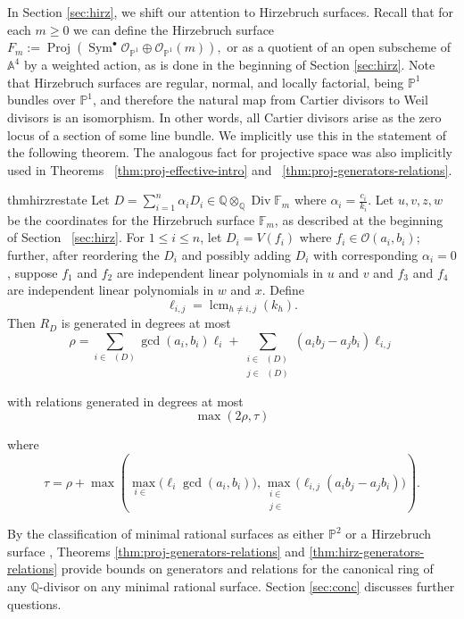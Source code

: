 \documentclass{amsart}
\theoremstyle{plain}
\theoremstyle{definition}
\theoremstyle{remark}
\numberwithin{equation}{section}
\newcommand\bq{{\mathbb Q}}
\newcommand\bp{{\mathbb P}}
\newcommand\ba{{\mathbb A}}
\newcommand\sco{{\mathscr O}}
\DeclareMathOperator{\sym}{Sym}
\DeclareMathOperator\di{Div}
\newcommand\bida{a}
\newcommand\bidb{b}
\newcommand\hirz{\mathbb{F}}
\DeclareMathOperator{\proj}{Proj}
\DeclareMathOperator{\Te}{T_=}
\DeclareMathOperator{\Tp}{T_+}
\DeclareMathOperator{\Tm}{T_-}
\DeclareMathOperator{\lcm}{lcm}
\begin{document}
\noindent
In Section \ref{sec:hirz}, we shift our attention to Hirzebruch surfaces. Recall that for each $m \geq 0$ we can define the
Hirzebruch surface $F_m := \proj(\sym^\bullet \sco_{\bp^1} \oplus
\sco_{\bp^1}(m)),$ or as a quotient of an open subscheme of
$\ba^4$ by a 
weighted action, as is done in the
beginning of Section \ref{sec:hirz}.
Note that Hirzebruch surfaces are regular, normal,
and locally factorial, being $\bp^1$ bundles over
$\bp^1$, and therefore the natural map from Cartier
divisors to Weil divisors is an isomorphism.
In other words, all Cartier divisors arise as the zero locus
of a section of some line bundle. We implicitly use this in the
statement of the following theorem. The analogous fact for
projective space was also implicitly used in Theorems
~\ref{thm:proj-effective-intro} and ~\ref{thm:proj-generators-relations}.

\begin{restatable}{thm}{hirzrestate}
\label{thm:hirz-generators-relations}
Let $D = \sum_{i=1}^n \alpha_i D_i \in \bq
\otimes_\bq \di \hirz_m$ 
where $\alpha_i = \frac{c_i}{k_i}$.
Let $u,v,z,w$ be the coordinates for the Hirzebruch surface
$\hirz_m$, as described at the beginning of Section
~\ref{sec:hirz}. For $1 \leq i \leq n$, let $D_i =
V(f_i)$ where $f_i \in \sco(a_i, b_i)$; further, after reordering
the $D_i$ and possibly adding $D_i$ with corresponding $\alpha_i = 0$, suppose $f_1$ and $f_2$ are
independent linear
polynomials in $u$ and $v$ and $f_3$ and $f_4$ are independent
linear polynomials in $w$ and $x$.
Define
\[\ell_{i,j} = \lcm_{h\ne i,j}(k_h).\] 
Then $R_D$ is generated in degrees at most
\[
	\rho = \sum_{i\in \Te(D)} \gcd(\bida_i, \bidb_i)\ell_i +
	\sum_{\substack{i \in \Tp(D) \\	j \in \Tm(D)}} (\bida_i \bidb_j
	- \bida_j \bidb_i) \ell_{i, j}
\]

\noindent
with relations generated in degrees at most 
\[
	\max(2 \rho, \tau)
\]

\noindent
where
\[
	\tau = \rho
	+ \max \left( \max_{i\in \Te} \bigl(\ell_i \gcd(a_i, b_i) \bigr),
	\max_{\substack{i \in \Tp \\ j \in \Tm}} \bigl(\ell_{i, j}
	(\bida_i \bidb_j - \bida_j \bidb_i) \bigr) \right).
\]
\end{restatable}

\noindent
By the classification of minimal rational surfaces
as either $\bp^2$ or a Hirzebruch surface \cite{eisenbud-harris:minimal},
Theorems \ref{thm:proj-generators-relations} and
\ref{thm:hirz-generators-relations} provide bounds on generators
and relations for the canonical ring of any $\bq$-divisor on any
minimal rational surface. Section \ref{sec:conc} discusses further questions.
\end{document}
